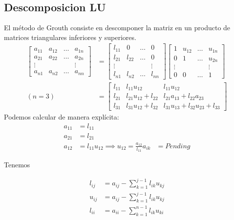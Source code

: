 \documentclass{article}
\theoremstyle{problemstyle}
\begin{document}
  \subsection{Descomposicion LU}
  El m\'etodo de Grouth consiste en descomponer la matriz en un producto de matrices triangulares inferiores y superiores.
  \begin{align*}
    \begin{bmatrix}
      a_{11} & a_{12} & \dots & a_{1n}\\
      a_{21} & a_{22} &\dots & a_{2n}\\
      \vdots & & &\vdots\\
      a_{n1} & a_{n2} & \dots & a_{nn}
    \end{bmatrix} &=
    \begin{bmatrix}
      l_{11} & 0 & \dots & 0\\
      l_{21} & l_{22} &\dots & 0\\
      \vdots & & &\vdots\\
      l_{n1} & l_{n2} & \dots & l_{nn}
    \end{bmatrix}  
    \begin{bmatrix}
      1 & u_{12} & \dots & u_{1n}\\
      0 & 1&\dots & u_{2n}\\
      \vdots & & &\vdots\\
      0 & 0 & \dots & 1 
    \end{bmatrix}  \\
    (n = 3)&=
    \begin{bmatrix}
      l_{11} & l_{11} u_{12} & l_{11}u_{12}\\
      l_{21} & l_{21}u_{12} + l_{22} & l_{21}a_{13} + l_{22}a_{23}\\
      l_{31} & l_{31}u_{12} + l_{32} & l_{31}u_{13}+ l_{32}u_{23}+l_{33}
    \end{bmatrix}
  \end{align*}
  Podemos calcular de manera expl\'icita:
\begin{align*}
  a_{11} &= l_{11}\\
  a_{21} &= l_{21}\\
  a_{12} &= l_{11}u_{12} \implies u_{12} = \displaystyle\frac{a_{12}}{l_{11}}
  a_{ik} &= Pending
\end{align*}

Tenemos

\begin{align*}
  l_{ij} &= a_{ij} - \sum_{k = 1}^{j-1}l_{ik}u_{kj}\\
  u_{ij}&= a_{ij} - \sum_{k=1}^{j-1}l_{ik}u_{kj}\\
  l_{ii} &= a_{ii} - \sum_{k=1}^{n-1}l_{ik}u_{ki}
\end{align*}
\end{document}
